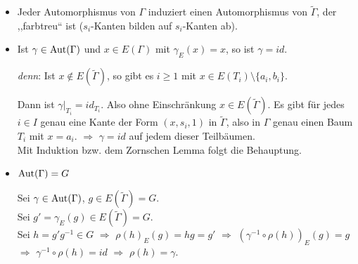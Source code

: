 \documentclass[a4paper, 10pt]{report}
\begin{document}
\begin{Satz}[Frucht 1938]
\begin{Bew}
\begin{itemize}
\item Jeder Automorphismus von $\Gamma$ induziert einen Automorphismus von $\tilde\Gamma$, der ,,farbtreu`` ist ($s_i$-Kanten bilden auf $s_i$-Kanten ab).

\item Ist $\gamma \in \mbox{Aut}(\Gamma)$ und $x \in E(\Gamma)$ mit $\gamma_E(x) = x$, so ist $\gamma = id$.

\emph{denn}: Ist $x \notin E(\tilde\Gamma)$, so gibt es $i \geq 1$ mit $x \in E(T_i) \setminus \{a_i, b_i\}$.

Dann ist $\gamma|_{T_i} = {id}_{T_i}$. Also ohne Einschr\"ankung $x \in E(\tilde\Gamma)$. Es gibt f\"ur jedes $i \in I$ genau eine Kante der Form $(x,s_i,1)$ in $\tilde\Gamma$, also in $\Gamma$ genau einen Baum $T_i$ mit $x = a_i$. $\Rightarrow$ $\gamma = id$ auf jedem dieser Teilb\"aumen.\\
Mit Induktion bzw. dem Zornschen Lemma folgt die Behauptung.

\item $\mbox{Aut}(\Gamma) = G$

Sei $\gamma \in \mbox{Aut}(\Gamma)$, $g \in E(\tilde\Gamma) = G$.\\
Sei $g' = \gamma_E(g) \in E(\tilde\Gamma) = G$.\\
Sei $h = g' g^{-1} \in G$ $\Rightarrow$ $\rho(h)_E(g) = h g = g'$ $\Rightarrow$ $(\gamma^{-1} \circ \rho(h))_E(g) = g$ $\Rightarrow$ $\gamma^{-1} \circ \rho(h) = id$ $\Rightarrow$ $\rho(h) = \gamma$.

\end{itemize}
\end{Bew}

\end{Satz}
\end{document}
